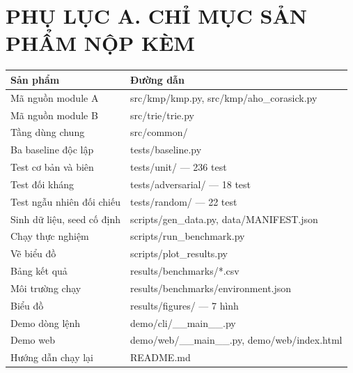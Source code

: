 
\chapter*{PHỤ LỤC A. CHỈ MỤC SẢN PHẨM NỘP KÈM}

\begin{center}
\end{center}

{\footnotesize\singlespacing
\begin{longtable}[]{@{}
  >{\raggedright\arraybackslash}p{}
  >{\raggedright\arraybackslash}p{}@{}}
\toprule\noalign{}
\begin{minipage}[b]{\linewidth}\raggedright
Sản phẩm
\end{minipage} & \begin{minipage}[b]{\linewidth}\raggedright
Đường dẫn
\end{minipage} \\
\midrule\noalign{}
\endhead
\bottomrule\noalign{}
\endlastfoot
Mã nguồn module A & src/kmp/kmp.py, src/kmp/aho\_corasick.py \\
Mã nguồn module B & src/trie/trie.py \\
Tầng dùng chung & src/common/ \\
Ba baseline độc lập & tests/baseline.py \\
Test cơ bản và biên & tests/unit/ --- 236 test \\
Test đối kháng & tests/adversarial/ --- 18 test \\
Test ngẫu nhiên đối chiếu & tests/random/ --- 22 test \\
Sinh dữ liệu, seed cố định & scripts/gen\_data.py, data/MANIFEST.json \\
Chạy thực nghiệm & scripts/run\_benchmark.py \\
Vẽ biểu đồ & scripts/plot\_results.py \\
Bảng kết quả & results/benchmarks/*.csv \\
Môi trường chạy & results/benchmarks/environment.json \\
Biểu đồ & results/figures/ --- 7 hình \\
Demo dòng lệnh & demo/cli/\_\_main\_\_.py \\
Demo web & demo/web/\_\_main\_\_.py, demo/web/index.html \\
Hướng dẫn chạy lại & README.md \\
\end{longtable}
}

